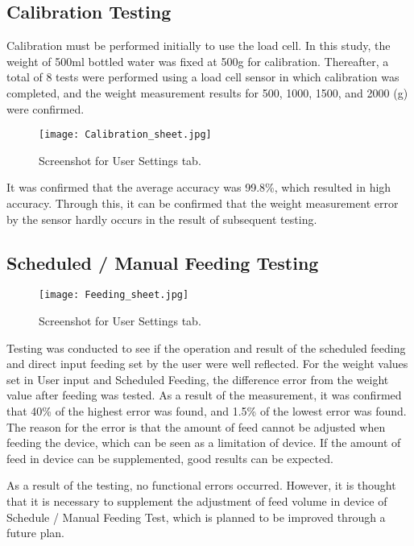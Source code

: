 \documentclass[conference]{IEEEtran}
\begin{document}
\subsection{Calibration Testing}
Calibration must be performed initially to use the load cell. 
In this study, the weight of 500ml bottled water was fixed at 500g for calibration. Thereafter, a total of 8 tests were performed using a load cell sensor in which calibration was completed, and the weight measurement results for 500, 1000, 1500, and 2000 (g) were confirmed.

\begin{figure}[htbp]
\centerline{\texttt{[image: Calibration\_sheet.jpg]}}
\caption{Screenshot for User Settings tab.}
\label{fig}
\end{figure}

It was confirmed that the average accuracy was 99.8\%, which resulted in high accuracy. Through this, it can be confirmed that the weight measurement error by the sensor hardly occurs in the result of subsequent testing.

\subsection{Scheduled / Manual Feeding Testing}

\begin{figure}[htbp]
\centerline{\texttt{[image: Feeding\_sheet.jpg]}}
\caption{Screenshot for User Settings tab.}
\label{fig}
\end{figure}

Testing was conducted to see if the operation and result of the scheduled feeding and direct input feeding set by the user were well reflected.
For the weight values set in User input and Scheduled Feeding, the difference error from the weight value after feeding was tested.
As a result of the measurement, it was confirmed that 40\% of the highest error was found, and 1.5\% of the lowest error was found.
The reason for the error is that the amount of feed cannot be adjusted when feeding the device, which can be seen as a limitation of device. If the amount of feed in device can be supplemented, good results can be expected.

As a result of the testing, no functional errors occurred.
However, it is thought that it is necessary to supplement the adjustment of feed volume in device of Schedule / Manual Feeding Test, which is planned to be improved through a future plan.
\end{document}

